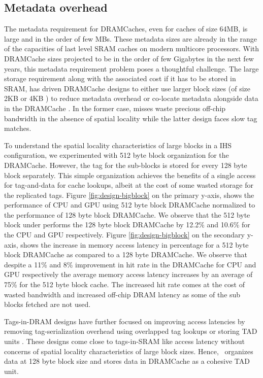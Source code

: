 \subsection{Metadata overhead} 
The metadata requirement for DRAMCaches, even for caches of size 64MB, is large and in the order of few MBs. These metadata sizes are  already in the range of the capacities of last level SRAM caches on modern multicore processors. With DRAMCache sizes projected to be in the order of few Gigabytes in the next few years, this metadata requirement problem poses a thoughtful challenge. The large storage requirement along with the associated cost if it has to be stored in SRAM, has driven DRAMCache designs to either use larger block sizes (of size 2KB or 4KB \cite{footprint,unison-cache}) to reduce metadata overhead or co-locate metadata alongside data in the DRAMCache \cite{loh-hill,alloy,atcache}. 
In the former case, misses waste precious off-chip bandwidth in the absence of spatial locality while the latter design faces slow tag matches.
\par To understand the spatial locality characteristics of large blocks in a IHS configuration, we experimented with 512 byte block organization for the DRAMCache. 
However, the tag for the sub-blocks is stored for every 128 byte block separately. This simple organization achieves the benefits of a single access for tag-and-data \cite{alloy} for cache lookups, albeit at the cost of some wasted storage for the replicated tags. Figure \ref{fig:design-bigblock} on the primary y-axis, shows the performance of CPU and GPU using 512 byte block DRAMCache normalized to the performance of 128 byte block DRAMCache. We observe that the 512 byte block under performs the 128 byte block DRAMCache by 12.2\% and 10.6\% for the CPU and GPU respectively. Figure \ref{fig:design-bigblock} on the secondary y-axis, shows the increase in memory access latency in percentage for a 512 byte block DRAMCache as compared to a 128 byte DRAMCache. We observe that despite a 11\% and 8\% improvement in hit rate in the DRAMCache for CPU and GPU respectively the average memory access latency increases by an average of 75\% for the 512 byte block cache. The increased hit rate comes at the cost of wasted bandwidth and increased off-chip DRAM latency as some of the sub blocks fetched are not used.
\par Tags-in-DRAM designs have further focused on improving access latencies by removing tag-serialization overhead using overlapped tag lookups \cite{loh-hill} or storing TAD units \cite{alloy}. These designs come close to tags-in-SRAM like access latency without concerns of spatial locality characteristics of large block sizes. 
Hence, \cachename\ organizes data at 128 byte block size and stores data in DRAMCache as a cohesive TAD unit.

